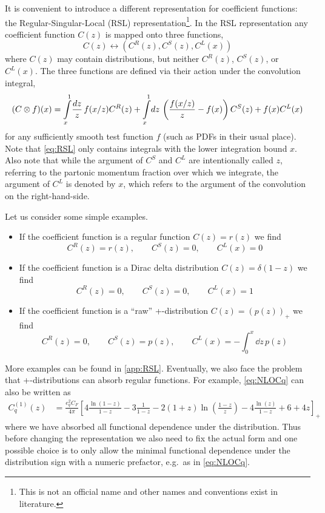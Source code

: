 It is convenient to introduce a different representation for coefficient functions: the Regular-Singular-Local (RSL) representation\footnote{This is not an official name and other names and conventions exist in literature.}.
In the RSL representation any coefficient function $C(z)$ is mapped onto three functions,
\begin{equation}
    C(z) \leftrightarrow (C^R(z), C^S(z), C^L(x))
\end{equation}
where $C(z)$ may contain distributions, but neither $C^R(z)$, $C^S(z)$, or $C^L(x)$.
The three functions are defined via their action under the convolution integral,
\begin{equation}
    \qty(C\otimes f)(x) =  \int\limits_x^1 \! \frac{dz}{z} \, f(x/z) C^R(z) + \int\limits_x^1 \! dz \, \left(\frac{f(x/z)}{z} - f(x)\right) C^S(z) + f(x) C^L(x) \label{eq:RSL}
\end{equation}
for any sufficiently smooth test function $f$ (such as PDFs in their usual place).
Note that \cref{eq:RSL} only contains integrals with the lower integration bound $x$.
Also note that while the argument of $C^S$ and $C^L$ are intentionally called $z$, referring to the partonic momentum fraction over which we integrate, the argument of $C^L$ is denoted by $x$, which refers to the argument of the convolution on the right-hand-side.

Let us consider some simple examples.
\begin{itemize}
    \item If the coefficient function is a regular function $C(z) = r(z)$ we find
        \begin{equation}
            C^R(z) = r(z), \qquad C^S(z) = 0, \qquad C^L(x) = 0
        \end{equation}
    \item If the coefficient function is a Dirac delta distribution $C(z) = \delta(1-z)$ we find
        \begin{equation}
            C^R(z) = 0, \qquad C^S(z) = 0, \qquad C^L(x) = 1
        \end{equation}
    \item If the coefficient function is a \enquote{raw} +-distribution $C(z) = (p(z))_+$ we find
        \begin{equation}
            C^R(z) = 0, \qquad C^S(z) = p(z), \qquad C^L(x) = -\int_0^x \! \dd z\, p(z) \label{eq:RSLD}
        \end{equation}
\end{itemize}
More examples can be found in \cref{app:RSL}.
Eventually, we also face the problem that +-distributions can absorb regular functions.
For example, \cref{eq:NLOCq} can also be written as
\begin{align}
    C_q^{(1)}(z) &= \frac{e_q^2 C_F}{4\pi} \left[ 4 \frac{\ln(1-z)}{1-z} - 3 \frac{1}{1-z} - 2(1+z)\ln\left(\frac{1-z}{z}\right) - 4 \frac{\ln(z)}{1-z} + 6 + 4z\right]_+ \label{eq:NLOCqp}
\end{align}
where we have absorbed all functional dependence under the distribution.
Thus before changing the representation we also need to fix the actual form and one possible choice is to only allow the minimal functional dependence under the distribution sign with a numeric prefactor, e.g.\ as in \cref{eq:NLOCq}.


